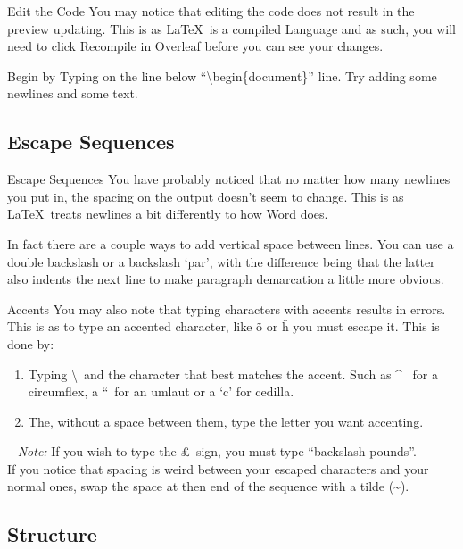 \documentclass{beamer}
\begin{document}
\begin{frame}{Edit the Code}
You may notice that editing the code does not result in the preview updating. This is as \LaTeX~is a compiled Language and as such, you will need to click Recompile in Overleaf before you can see your changes.\par
Begin by Typing on the line below ``\textbackslash begin\{document\}'' line. Try adding some newlines and some text.
\end{frame}

\subsection{Escape Sequences}

\begin{frame}{Escape Sequences}
You have probably noticed that no matter how many newlines you put in, the spacing on the output doesn't seem to change. This is as \LaTeX~treats newlines a bit differently to how Word does.\par
In fact there are a couple ways to add vertical space between lines. You can use a double backslash or a backslash `par', with the difference being that the latter also indents the next line to make paragraph demarcation a little more obvious.
\end{frame}

\begin{frame}{Accents}
You may also note that typing characters with accents results in errors. This is as to type an accented character, like \~o or \^h you must escape it. This is done by:
\begin{enumerate}
\item Typing \textbackslash~and the character that best matches the accent. Such as \^~ for a circumflex, a ``~for an umlaut or a `c' for cedilla. 
\item The, without a space between them, type the letter you want accenting.
\end{enumerate}\par~
\emph{Note:} If you wish to type the \pounds~sign, you must type ``backslash pounds''.\\
If you notice that spacing is weird between your escaped characters and your normal ones, swap the space at then end of the sequence with a tilde (\textasciitilde{}).
\end{frame}

\subsection{Structure}
\end{document}
